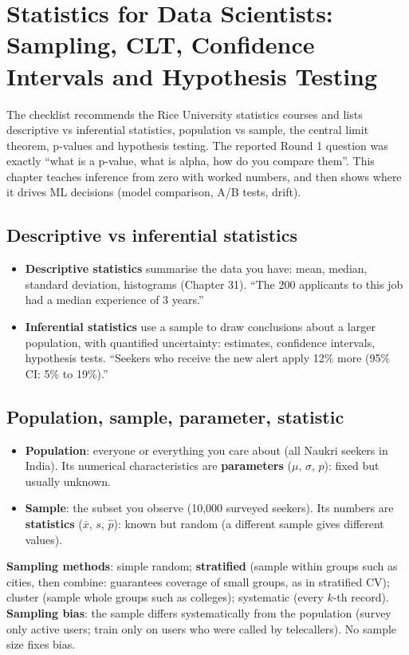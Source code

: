 \chapter{Statistics for Data Scientists: Sampling, CLT, Confidence Intervals and Hypothesis Testing}

The checklist recommends the Rice University statistics courses and lists descriptive vs inferential statistics, population vs sample, the central limit
theorem, p-values and hypothesis testing. The reported Round 1 question was exactly ``what is a p-value, what is alpha, how do you compare them''. This
chapter teaches inference from zero with worked numbers, and then shows where it drives ML decisions (model comparison, A/B tests, drift).

\section{Descriptive vs inferential statistics}
\begin{itemize}
\item \textbf{Descriptive statistics} summarise the data you have: mean, median, standard deviation, histograms (Chapter 31). ``The 200 applicants to this job had a
  median experience of 3 years.''
\item \textbf{Inferential statistics} use a sample to draw conclusions about a larger population, with quantified uncertainty: estimates, confidence intervals,
  hypothesis tests. ``Seekers who receive the new alert apply 12\% more (95\% CI: 5\% to 19\%).''
\end{itemize}

\section{Population, sample, parameter, statistic}
\begin{itemize}
\item \textbf{Population}: everyone or everything you care about (all Naukri seekers in India). Its numerical characteristics are \textbf{parameters} ($\mu$, $\sigma$, $p$):
  fixed but usually unknown.
\item \textbf{Sample}: the subset you observe (10{,}000 surveyed seekers). Its numbers are \textbf{statistics} ($\bar x$, $s$, $\hat p$): known but random (a different sample gives
  different values).
\end{itemize}
\textbf{Sampling methods}: simple random; \textbf{stratified} (sample within groups such as cities, then combine: guarantees coverage of small groups, as in stratified CV);
cluster (sample whole groups such as colleges); systematic (every $k$-th record). \textbf{Sampling bias}: the sample differs systematically from the population (survey only
active users; train only on users who were called by telecallers). No sample size fixes bias.

